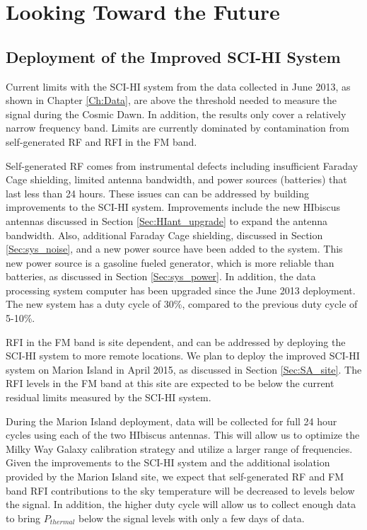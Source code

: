 \chapter{Looking Toward the Future}\label{Ch:Conclude}

\section{Deployment of the Improved SCI-HI System}

Current limits with the SCI-HI system from the data collected in June 2013, as shown in Chapter \ref{Ch:Data}, are above the threshold needed to measure the \cm signal during the Cosmic Dawn. In addition, the results only cover a relatively narrow frequency band. Limits are currently dominated by contamination from self-generated RF and RFI in the FM band. 

Self-generated RF comes from instrumental defects including insufficient Faraday Cage shielding, limited antenna bandwidth, and power sources (batteries) that last less than 24 hours. These issues can can be addressed by building improvements to the SCI-HI system. Improvements include the new HIbiscus antennas discussed in Section \ref{Sec:HIant_upgrade} to expand the antenna bandwidth. Also, additional Faraday Cage shielding, discussed in Section \ref{Sec:sys_noise}, and a new power source have been added to the system. This new power source is a gasoline fueled generator, which is more reliable than batteries, as discussed in Section \ref{Sec:sys_power}. In addition, the data processing system computer has been upgraded since the June 2013 deployment. The new system has a duty cycle of 30\%, compared to the previous duty cycle of 5-10\%.  

RFI in the FM band is site dependent, and can be addressed by deploying the SCI-HI system to more remote locations. We plan to deploy the improved SCI-HI system on Marion Island in April 2015, as discussed in Section \ref{Sec:SA_site}. The RFI levels in the FM band at this site are expected to be below the current residual limits measured by the SCI-HI system. 

During the Marion Island deployment, data will be collected for full 24 hour cycles using each of the two HIbiscus antennas. This will allow us to optimize the Milky Way Galaxy calibration strategy and utilize a larger range of frequencies. Given the improvements to the SCI-HI system and the additional isolation provided by the Marion Island site, we expect that self-generated RF and FM band RFI contributions to the sky temperature will be decreased to levels below the \cm signal. In addition, the higher duty cycle will allow us to collect enough data to bring $P_{thermal}$ below the \cm signal levels with only a few days of data. 

